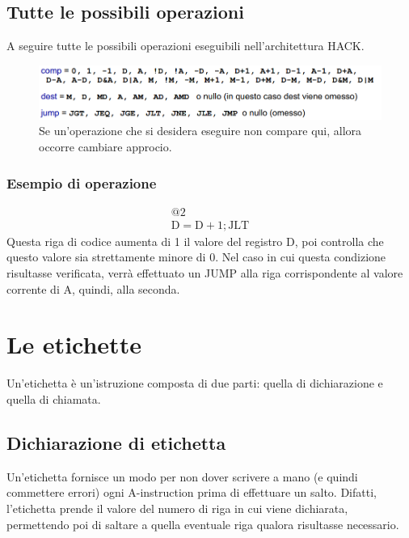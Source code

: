\documentclass[12pt]{article}
\begin{document}
\subsection{Tutte le possibili operazioni}
A seguire tutte le possibili operazioni eseguibili nell'architettura HACK.
\begin{figure}[!htb]
    \centering
    \includegraphics[width=.9\linewidth,height=.40\textheight,keepaspectratio]{ISA_HACK/operazioni.png} %
    \begin{center}
        \caption{\label{fig:operazioni} Se un'operazione che si desidera eseguire non compare qui, allora occorre cambiare approcio.} %
    \end{center}
\end{figure}
\subsubsection{Esempio di operazione}
\begin{gather*}
    @2\\
    \text{D}=\text{D} + 1;\text{JLT}
\end{gather*}
Questa riga di codice aumenta di 1 il valore del registro D, poi controlla che questo valore sia strettamente minore di 0.
Nel caso in cui questa condizione risultasse verificata, verrà effettuato un JUMP alla riga corrispondente al valore corrente di A, quindi, alla seconda.

\section{Le etichette}
Un'etichetta è un'istruzione composta di due parti: quella di dichiarazione e quella di chiamata.

\subsection{Dichiarazione di etichetta}
Un'etichetta fornisce un modo per non dover scrivere a mano (e quindi commettere errori) ogni A-instruction prima di effettuare un salto.
Difatti, l'etichetta prende il valore del numero di riga in cui viene dichiarata, permettendo poi di saltare a quella eventuale riga qualora risultasse necessario.
\end{document}
